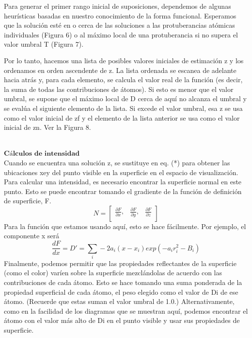 Para generar el primer rango inicial de suposiciones, dependemos de algunas heurísticas basadas en nuestro conocimiento de la forma funcional. Esperamos que la solución esté en o cerca de las soluciones a las protuberancias atómicas individuales (Figura 6) o al máximo local de una protuberancia si no supera el valor umbral T (Figura 7).

Por lo tanto, hacemos una lista de posibles valores iniciales de estimación z y los ordenamos en orden ascendente de z. La lista ordenada se escanea de adelante hacia atrás y, para cada elemento, se calcula el valor real de la función (es decir, la suma de todas las contribuciones de átomos). Si esto es menor que el valor umbral, se supone que el máximo local de D cerca de aquí no alcanza el umbral y se evalúa el siguiente elemento de la lista. Si excede el valor umbral, esa z se usa como el valor inicial de zf y el elemento de la lista anterior se usa como el valor inicial de zn. Ver la Figura 8.

${ }$\\
$\textbf{Cálculos de intensidad}$
${ }$\\

Cuando se encuentra una solución z, se sustituye en eq. (*) para obtener las ubicaciones xey del punto visible en la superficie en el espacio de visualización. Para calcular una intensidad, es necesario encontrar la superficie normal en este punto. Esto se puede encontrar tomando el gradiente de la función de definición de superficie, F.
\[
	N = \left[ {\begin{array}{ccc}
		\frac{\partial F}{\partial x}, & \frac{\partial F}{\partial y}, & \frac{\partial F}{\partial z} \\
		\end{array} } \right]
\]
Para la función que estamos usando aquí, esto se hace fácilmente. Por ejemplo, el componente x será
\[
	\frac{dF}{dx} = D' = \sum_{i} -2 a_i (x - x_i) exp(-a_i r^{2}_{i} - B_i)
\]
Finalmente, podemos permitir que las propiedades reflectantes de la superficie (como el color) varíen sobre la superficie mezclándolas de acuerdo con las contribuciones de cada átomo. Esto se hace tomando una suma ponderada de la propiedad superficial de cada átomo, el peso elegido como el valor de Di de ese átomo. (Recuerde que estas suman el valor umbral de 1.0.) Alternativamente, como en la facilidad de los diagramas que se muestran aquí, podemos encontrar el átomo con el valor más alto de Di en el punto visible y usar sus propiedades de superficie.


